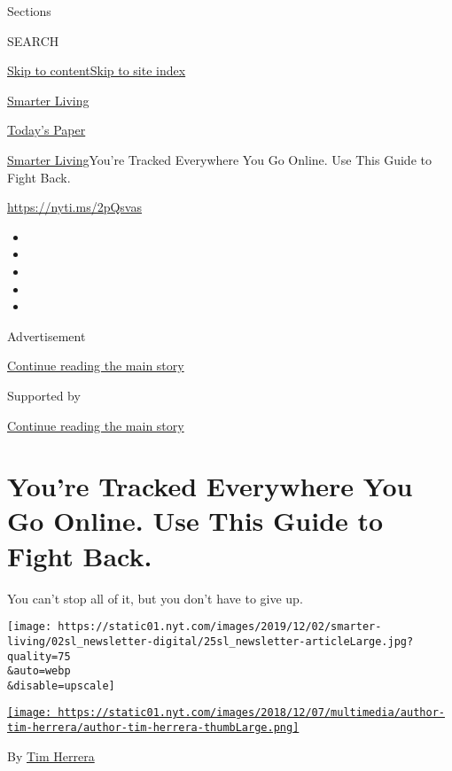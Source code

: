 Sections

SEARCH

\protect\hyperlink{site-content}{Skip to
content}\protect\hyperlink{site-index}{Skip to site index}

\href{https://www.nytimes.com/section/smarter-living}{Smarter Living}

\href{https://myaccount.nytimes.com/auth/login?response_type=cookie\&client_id=vi}{}

\href{https://www.nytimes.com/section/todayspaper}{Today's Paper}

\href{/section/smarter-living}{Smarter Living}\textbar{}You're Tracked
Everywhere You Go Online. Use This Guide to Fight Back.

\href{https://nyti.ms/2pQsvas}{https://nyti.ms/2pQsvas}

\begin{itemize}
\item
\item
\item
\item
\item
\end{itemize}

Advertisement

\protect\hyperlink{after-top}{Continue reading the main story}

Supported by

\protect\hyperlink{after-sponsor}{Continue reading the main story}

\hypertarget{youre-tracked-everywhere-you-go-online-use-this-guide-to-fight-back}{%
\section{You're Tracked Everywhere You Go Online. Use This Guide to
Fight
Back.}\label{youre-tracked-everywhere-you-go-online-use-this-guide-to-fight-back}}

You can't stop all of it, but you don't have to give up.

\texttt{[image: https://static01.nyt.com/images/2019/12/02/smarter-living/02sl\_newsletter-digital/25sl\_newsletter-articleLarge.jpg?quality=75\\\&auto=webp\\\&disable=upscale]}

\href{https://www.nytimes.com/by/tim-herrera}{\texttt{[image: https://static01.nyt.com/images/2018/12/07/multimedia/author-tim-herrera/author-tim-herrera-thumbLarge.png]}}

By \href{https://www.nytimes.com/by/tim-herrera}{Tim Herrera}

